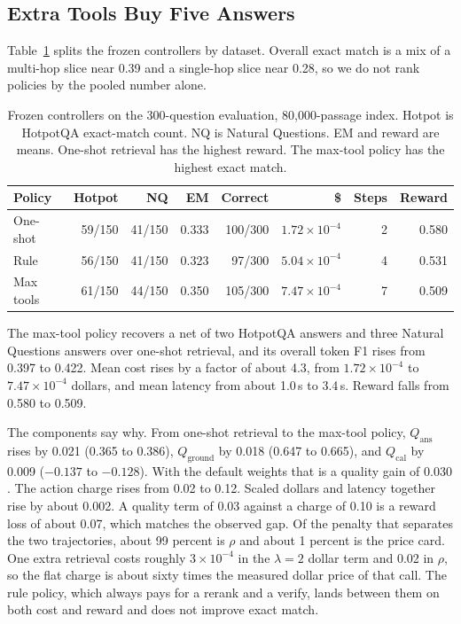\documentclass[letterpaper]{article} %
\begin{document}
\subsection{Extra Tools Buy Five Answers}
Table~\ref{tab:frozen} splits the frozen controllers by dataset. Overall exact match is a mix of a multi-hop slice near 0.39 and a single-hop slice near 0.28, so we do not rank policies by the pooled number alone.

\begin{table}[t]
\centering
\setlength{\tabcolsep}{4pt}
\begin{tabular}{lrrrrrrr}
\toprule
Policy & Hotpot & NQ & EM & Correct & \$ & Steps & Reward \\
\midrule
One-shot & 59/150 & 41/150 & 0.333 & 100/300 & \(1.72\times 10^{-4}\) & 2 & 0.580 \\
Rule & 56/150 & 41/150 & 0.323 & 97/300 & \(5.04\times 10^{-4}\) & 4 & 0.531 \\
Max tools & 61/150 & 44/150 & 0.350 & 105/300 & \(7.47\times 10^{-4}\) & 7 & 0.509 \\
\bottomrule
\end{tabular}
\caption{Frozen controllers on the 300-question evaluation, 80{,}000-passage index. Hotpot is HotpotQA exact-match count. NQ is Natural Questions. EM and reward are means. One-shot retrieval has the highest reward. The max-tool policy has the highest exact match.}
\label{tab:frozen}
\end{table}

The max-tool policy recovers a net of two HotpotQA answers and three Natural Questions answers over one-shot retrieval, and its overall token F1 rises from 0.397 to 0.422. Mean cost rises by a factor of about 4.3, from \(1.72\times 10^{-4}\) to \(7.47\times 10^{-4}\) dollars, and mean latency from about 1.0\,s to 3.4\,s. Reward falls from 0.580 to 0.509.

The components say why. From one-shot retrieval to the max-tool policy, \(Q_{\mathrm{ans}}\) rises by 0.021 (0.365 to 0.386), \(Q_{\mathrm{ground}}\) by 0.018 (0.647 to 0.665), and \(Q_{\mathrm{cal}}\) by 0.009 (\(-0.137\) to \(-0.128\)). With the default weights that is a quality gain of \(0.030\). The action charge rises from 0.02 to 0.12. Scaled dollars and latency together rise by about 0.002. A quality term of 0.03 against a charge of 0.10 is a reward loss of about 0.07, which matches the observed gap. Of the penalty that separates the two trajectories, about 99 percent is \(\rho\) and about 1 percent is the price card. One extra retrieval costs roughly \(3\times 10^{-4}\) in the \(\lambda{=}2\) dollar term and 0.02 in \(\rho\), so the flat charge is about sixty times the measured dollar price of that call. The rule policy, which always pays for a rerank and a verify, lands between them on both cost and reward and does not improve exact match.
\end{document}
